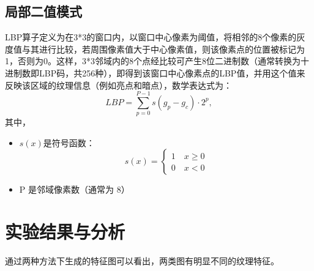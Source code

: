 \documentclass[a4paper,12pt]{report}
\begin{document}
\subsection{局部二值模式}
LBP算子定义为在3*3的窗口内，以窗口中心像素为阈值，将相邻的8个像素的灰度值与其进行比较，若周围像素值大于中心像素值，则该像素点的位置被标记为1，否则为0。这样，3*3邻域内的8个点经比较可产生8位二进制数（通常转换为十进制数即LBP码，共256种），即得到该窗口中心像素点的LBP值，并用这个值来反映该区域的纹理信息（例如亮点和暗点），数学表达式为：$$LBP=\sum_{p=0}^{P−1} s(g_p−g_c)\cdot 2^p,$$其中，

\begin{itemize}
    \item $s(x)$是符号函数：$$s(x)=\left\{ \begin{array}{rcl}1\quad x\ge 0\\0\quad x<0\end{array}\right.$$
    \item P 是邻域像素数（通常为 8）
\end{itemize}
\section{实验结果与分析}
\par 通过两种方法下生成的特征图可以看出，两类图有明显不同的纹理特征。
\end{document}
